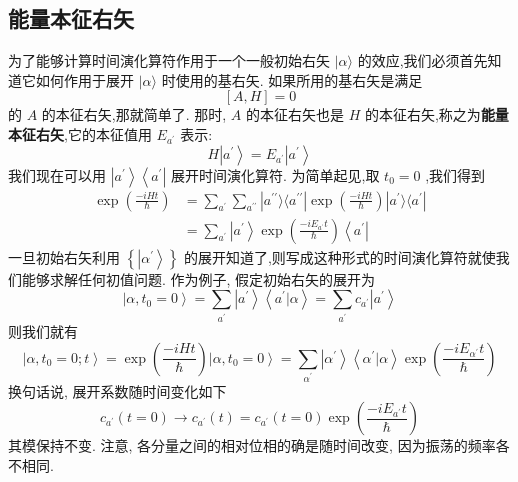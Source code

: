 \subsection{能量本征右矢}
为了能够计算时间演化算符作用于一个一般初始右矢 $|\alpha \rangle$ 的效应,我们必须首先知道它如何作用于展开 $|\alpha \rangle$ 时使用的基右矢. 如果所用的基右矢是满足
\begin{equation}
	\left\lbrack {A, H}\right\rbrack = 0
\end{equation}
的 $A$ 的本征右矢,那就简单了. 那时, $A$ 的本征右矢也是 $H$ 的本征右矢,称之为\textbf{能量本征右矢},它的本征值用 ${E}_{{a}^{\prime }}$ 表示:
\begin{equation}
	H\left| {a}^{\prime }\right\rangle = {E}_{{a}^{\prime }}\left| {a}^{\prime }\right\rangle
\end{equation}
我们现在可以用 $\left| {a}^{\prime }\right\rangle \left\langle {a}^{\prime }\right|$ 展开时间演化算符. 为简单起见,取 ${t}_{0} = 0$ ,我们得到
\begin{equation}
	\begin{aligned}
		\exp ( \frac{-{iHt}}{\hbar }) &= \mathop{\sum }\limits_{{a}^{\prime }}\mathop{\sum }\limits_{{a}^{\prime \prime }}| {a}^{\prime \prime }\rangle \langle {{a}^{\prime \prime }| {\exp ( \frac{-{iHt}}{\hbar }) }| {a}^{\prime }}\rangle \langle {a}^{\prime }|\\
		&=\mathop{\sum }\limits_{{a}^{\prime }}\left| {a}^{\prime }\right\rangle \exp \left( \frac{-i{E}_{{a}^{\prime }}t}{\hbar }\right) \left\langle {a}^{\prime }\right|
	\end{aligned}
\end{equation}
一旦初始右矢利用 $\left\{ \left| {\alpha }^{\prime }\right\rangle \right\}$ 的展开知道了,则写成这种形式的时间演化算符就使我们能够求解任何初值问题. 作为例子, 假定初始右矢的展开为
\begin{equation}
	\left| {\alpha ,{t}_{0} = 0}\right\rangle = \mathop{\sum }\limits_{{a}^{\prime }}\left| {a}^{\prime }\right\rangle \left\langle {{a}^{\prime } | \alpha }\right\rangle = \mathop{\sum }\limits_{{a}^{\prime }}{c}_{{a}^{\prime }}\left| {a}^{\prime }\right\rangle
\end{equation}
则我们就有
\begin{equation}
	\left| {\alpha ,{t}_{0} = 0;t}\right\rangle = \exp \left( \frac{-{iHt}}{\hbar }\right) \left| {\alpha ,{t}_{0} = 0}\right\rangle = \mathop{\sum }\limits_{{\alpha }^{\prime }}\left| {\alpha }^{\prime }\right\rangle \left\langle {{\alpha }^{\prime } | \alpha }\right\rangle \exp \left( \frac{-i{E}_{{\alpha }^{\prime }}t}{\hbar }\right)
\end{equation}
换句话说, 展开系数随时间变化如下
\begin{equation}
	{c}_{{a}^{\prime }}\left( {t = 0}\right) \rightarrow {c}_{{a}^{\prime }}\left( t\right) = {c}_{{a}^{\prime }}\left( {t = 0}\right) \exp \left( \frac{-i{E}_{{a}^{\prime }}t}{\hbar }\right)
\end{equation}
其模保持不变. 注意, 各分量之间的相对位相的确是随时间改变, 因为振荡的频率各不相同.

